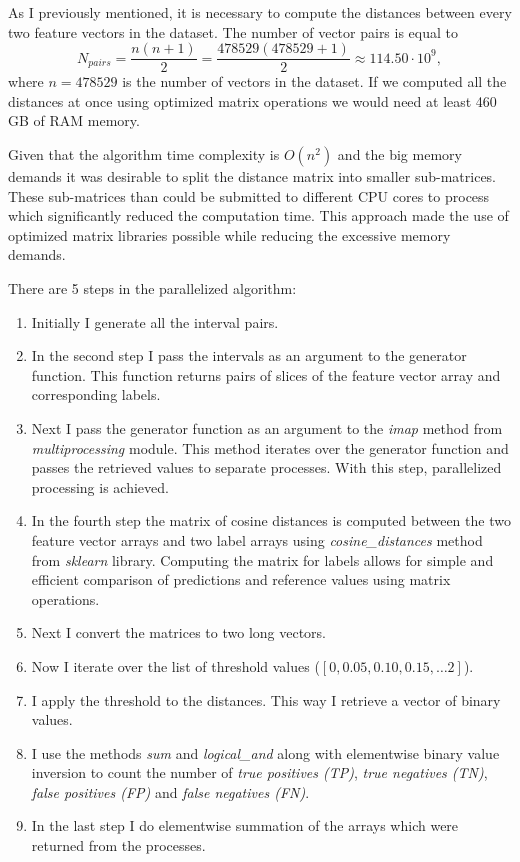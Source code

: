 As I previously mentioned, it is necessary to compute the distances between every two feature vectors in the dataset.
The number of vector pairs is equal to
\begin{equation}
    N_{pairs} = \frac{n\left(n+1\right)}{2} = \frac{478529\left(478529+1\right)}{2} \approx 114.50 \cdot 10^9,
\end{equation}
where $n = 478529$ is the number of vectors in the dataset.
If we computed all the distances at once using optimized matrix operations we would need at least 460 GB of RAM memory.

Given that the algorithm time complexity is $O(n^2)$ and the big memory demands it was desirable to split the distance
matrix into smaller sub-matrices.
These sub-matrices than could be submitted to different CPU cores to process which significantly reduced the computation
time.
This approach made the use of optimized matrix libraries possible while reducing the excessive memory demands.

There are 5 steps in the parallelized algorithm:
\begin{enumerate}
    \item Initially I generate all the interval pairs.
    \item In the second step I pass the intervals as an argument to the generator function.
    This function returns pairs of slices of the feature vector array and corresponding labels.
    \item Next I pass the generator function as an argument to the \textit{imap} method from \textit{multiprocessing}
    module.
    This method iterates over the generator function and passes the retrieved values to separate processes.
    With this step, parallelized processing is achieved.
    \item In the fourth step the matrix of cosine distances is computed between the two feature vector arrays
    and two label arrays using \textit{cosine\_distances} method from \textit{sklearn} library.
    Computing the matrix for labels allows for simple and efficient comparison of predictions and reference
    values using matrix operations.
    \item Next I convert the matrices to two long vectors.
    \item Now I iterate over the list of threshold values ($\left[ 0, 0.05, 0.10, 0.15, \ldots 2 \right]$).
    \item I apply the threshold to the distances.
    This way I retrieve a vector of binary values.
    \item I use the methods \textit{sum} and \textit{logical\_and} along with elementwise binary value inversion to
    count the number of \textit{true positives (TP)}, \textit{true negatives (TN)}, \textit{false positives (FP)} and
    \textit{false negatives (FN)}.
    \item In the last step I do elementwise summation of the arrays which were returned from the processes.
\end{enumerate}


